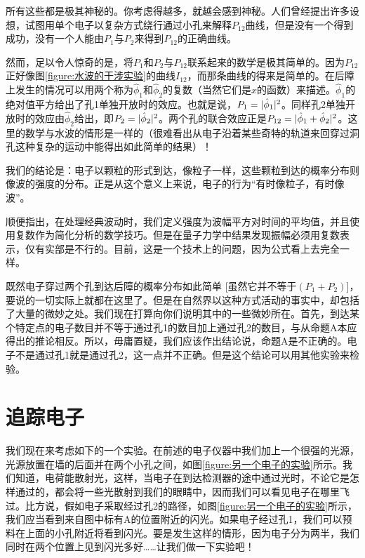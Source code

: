 所有这些都是极其神秘的。你考虑得越多，就越会感到神秘。人们曾经提出许多设想，试图用单个电子以复杂方式绕行通过小孔来解释$P_{12}$曲线，但是没有一个得到成功，没有一个人能由$P_1$与$P_2$来得到$P_{12}$的正确曲线。

然而，足以令人惊奇的是，将$P_1$和$P_2$与$P_{12}$联系起来的数学是极其简单的。因为$P_{12}$正好像图\ref{figure:水波的干涉实验}的曲线$I_{12}$，而那条曲线的得来是简单的。在后障上发生的情况可以用两个称为$\hat{\phi}_1$和$\hat{\phi}_2$的复数（当然它们是$x$的函数）来描述。$\hat{\phi}_1$的绝对值平方给出了孔1单独开放时的效应。也就是说，$P_1 = \lvert\hat{\phi}_1\rvert^2$。同样孔2单独开放时的效应由$\hat{\phi}_2$给出，即$P_2 = \lvert\hat{\phi}_2\rvert^2$。两个孔的联合效应正是$P_{12} = \lvert\hat{\phi}_1 + \hat{\phi}_2\rvert^2$。这里的数学与水波的情形是一样的（很难看出从电子沿着某些奇特的轨道来回穿过洞孔这种复杂的运动中能得出如此简单的结果）！

我们的结论是：电子以颗粒的形式到达，像粒子一样，这些颗粒到达的概率分布则像波的强度的分布。正是从这个意义上来说，电子的行为“有时像粒子，有时像波”。

顺便指出，在处理经典波动时，我们定义强度为波幅平方对时间的平均值，并且使用复数作为简化分析的数学技巧。但是在量子力学中结果发现振幅必须用复数表示，仅有实部是不行的。目前，这是一个技术上的问题，因为公式看上去完全一样。

既然电子穿过两个孔到达后障的概率分布如此简单 [虽然它并不等于$(P_1+P_2)$]，要说的一切实际上就都在这里了。但是在自然界以这种方式活动的事实中，却包括了大量的微妙之处。我们现在打算向你们说明其中的一些微妙所在。首先，到达某个特定点的电子数目并不等于通过孔1的数目加上通过孔2的数目，与从命题A本应得出的推论相反。所以，毋庸置疑，我们应该作出结论说，命题A是不正确的。电子不是通过孔1就是通过孔2，这一点并不正确。但是这个结论可以用其他实验来检验。

\section{追踪电子}

我们现在来考虑如下的一个实验。在前述的电子仪器中我们加上一个很强的光源，光源放置在墙的后面并在两个小孔之间，如图\ref{figure:另一个电子的实验}所示。我们知道，电荷能散射光，这样，当电子在到达检测器的途中通过光时，不论它是怎样通过的，都会将一些光散射到我们的眼睛中，因而我们可以看见电子在哪里飞过。比方说，假如电子采取经过孔2的路径，如图\ref{figure:另一个电子的实验}所示，我们应当看到来自图中标有A的位置附近的闪光。如果电子经过孔1，我们可以预料在上面的小孔附近将看到闪光。要是发生这样的情形，因为电子分为两半，我们同时在两个位置上见到闪光多好……让我们做一下实验吧！


